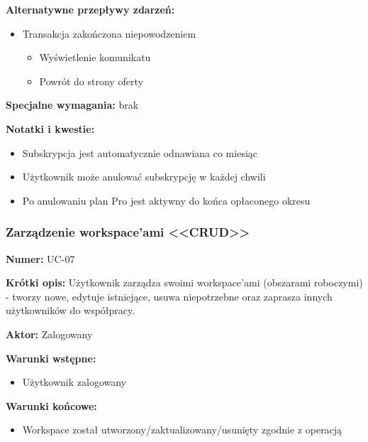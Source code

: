 \documentclass[12pt,a4paper]{article}
\begin{document}
\textbf{Alternatywne przepływy zdarzeń:}
\begin{itemize}[leftmargin=*]
    \item[3a] Transakcja zakończona niepowodzeniem
    \begin{itemize}
    \item Wyświetlenie komunikatu
    \item Powrót do strony oferty
\end{itemize}
\end{itemize}

\textbf{Specjalne wymagania:}
brak

\textbf{Notatki i kwestie:} \begin{itemize}
    \item Subskrypcja jest automatycznie odnawiana co miesiąc
    \item Użytkownik może anulować subskrypcję w każdej chwili
    \item Po anulowaniu plan Pro jest aktywny do końca opłaconego okresu
\end{itemize}

\subsubsection{Zarządzenie workspace'ami <<CRUD>>}

\textbf{Numer:} UC-07

\textbf{Krótki opis:} Użytkownik zarządza swoimi workspace'ami (obszarami roboczymi) - tworzy nowe, edytuje istniejące, usuwa niepotrzebne oraz zaprasza innych użytkowników do współpracy.

\textbf{Aktor:} Zalogowany

\textbf{Warunki wstępne:}
\begin{itemize}[leftmargin=*]
    \item Użytkownik zalogowany
\end{itemize}

\textbf{Warunki końcowe:}
\begin{itemize}[leftmargin=*]
    \item Workspace został utworzony/zaktualizowany/usunięty zgodnie z operacją
\end{itemize}
\end{document}
